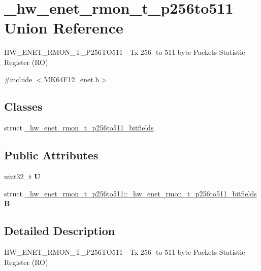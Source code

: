 \hypertarget{union__hw__enet__rmon__t__p256to511}{}\section{\+\_\+hw\+\_\+enet\+\_\+rmon\+\_\+t\+\_\+p256to511 Union Reference}
\label{union__hw__enet__rmon__t__p256to511}


H\+W\+\_\+\+E\+N\+E\+T\+\_\+\+R\+M\+O\+N\+\_\+\+T\+\_\+\+P256\+T\+O511 -\/ Tx 256-\/ to 511-\/byte Packets Statistic Register (RO)  




{\ttfamily \#include $<$M\+K64\+F12\+\_\+enet.\+h$>$}

\subsection*{Classes}
\begin{DoxyCompactItemize}
\item 
struct \hyperlink{struct__hw__enet__rmon__t__p256to511_1_1__hw__enet__rmon__t__p256to511__bitfields}{\+\_\+hw\+\_\+enet\+\_\+rmon\+\_\+t\+\_\+p256to511\+\_\+bitfields}
\end{DoxyCompactItemize}
\subsection*{Public Attributes}
\begin{DoxyCompactItemize}
\item 
uint32\+\_\+t {\bfseries U}\hypertarget{union__hw__enet__rmon__t__p256to511_aad81fcbdf22c59953d207b5122b07688}{}\label{union__hw__enet__rmon__t__p256to511_aad81fcbdf22c59953d207b5122b07688}

\item 
struct \hyperlink{struct__hw__enet__rmon__t__p256to511_1_1__hw__enet__rmon__t__p256to511__bitfields}{\+\_\+hw\+\_\+enet\+\_\+rmon\+\_\+t\+\_\+p256to511\+::\+\_\+hw\+\_\+enet\+\_\+rmon\+\_\+t\+\_\+p256to511\+\_\+bitfields} {\bfseries B}\hypertarget{union__hw__enet__rmon__t__p256to511_a272f99a9cb723b67c3cd67360486ad4f}{}\label{union__hw__enet__rmon__t__p256to511_a272f99a9cb723b67c3cd67360486ad4f}

\end{DoxyCompactItemize}


\subsection{Detailed Description}
H\+W\+\_\+\+E\+N\+E\+T\+\_\+\+R\+M\+O\+N\+\_\+\+T\+\_\+\+P256\+T\+O511 -\/ Tx 256-\/ to 511-\/byte Packets Statistic Register (RO) 

